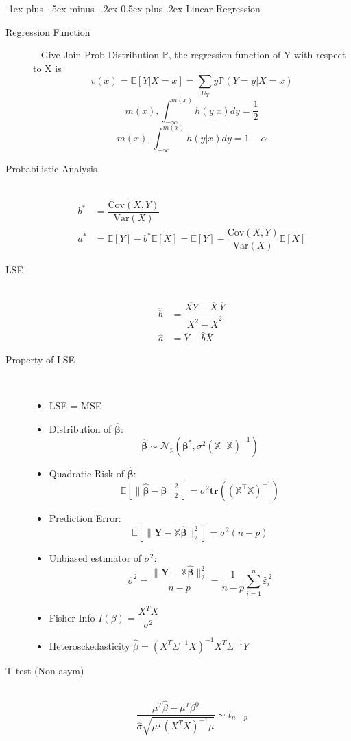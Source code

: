 \documentclass[a4paper, 10pt,landscape]{article}
\makeatletter
\newcommand{\var}{\textrm{Var}}
\newcommand{\cov}{\textrm{Cov}}
\renewcommand{\section}{\@startsection{section}{1}{0mm}%
                                {-1ex plus -.5ex minus -.2ex}%
                                {0.5ex plus .2ex}%
                                {\normalfont\large\bfseries}}
\makeatother
\begin{document}
\begin{multicols*}{4}
\section{Linear Regression}
	\begin{description}
		\item[Regression Function]~
			Give Join Prob Distribution $\mathbb{P}$, the regression function of Y with respect to X is 
			$$v(x) = \mathbb{E}[Y|X=x]=\sum_{\Omega_{Y}}y \mathbb{P}(Y=y|X=x)$$
			$$m(x), \int_{-\infty}^{m(x)}h(y|x)dy=\frac{1}{2}$$
			$$m(x), \int_{-\infty}^{m(x)}h(y|x)dy=1-\alpha$$
		\item[Probabilistic Analysis]~
			\begin{align*}
				b^* & = \dfrac{\cov\left(X,Y\right)}{\var\left(X\right)}\\
				a^* & = \mathbb{E}[Y]-b^*\mathbb{E}[X]=\mathbb{E}[Y]-\dfrac{\cov\left(X,Y\right)}{\var\left(X\right)}\mathbb{E}[X]
			\end{align*}
		\item[LSE]~
				\begin{align*}
					\hat{b} & = \dfrac{\overline{XY}-\overline{X}\,\overline{Y}}{\overline{X^2}-\overline{X}^2}\\
					\hat{a} & = \overline{Y}-\hat{b}\overline{X}
				\end{align*}
		\item[Property of LSE]~
			\begin{itemize}
				\item LSE = MSE
				\item Distribution of $\widehat{\boldsymbol{\beta}}$:
				$$\widehat{\boldsymbol{\beta}}\sim\mathcal{N}_p\left(\boldsymbol{\beta}^*,\sigma^2\left(\mathbb{X}^\intercal\mathbb{X}\right)^{-1}\right)$$
				\item Quadratic Risk of $\widehat{\boldsymbol{\beta}}$:
				$$\mathbb{E}\left[\lVert\widehat{\boldsymbol{\beta}}-\boldsymbol{\beta}\rVert_2^2\right]=\sigma^2\textbf{tr}\left(\left(\mathbb{X}^\intercal\mathbb{X}\right)^{-1}\right)$$
				\item Prediction Error:
				$$\mathbb{E}\left[\lVert\mathbf{Y}-\mathbb{X}\widehat{\boldsymbol{\beta}}\rVert_2^2\right]=\sigma^2\left(n-p\right)$$
				\item Unbiased estimator of $\sigma^2$:
				$$\widehat{\sigma}^2=\dfrac{\lVert\mathbf{Y}-\mathbb{X}\widehat{\boldsymbol{\beta}}\rVert_2^2}{n-p}=\dfrac{1}{n-p}\sum_{i=1}^{n}\widehat{\varepsilon}_i^{\,2}$$
				\item Fisher Info $I(\beta) = \dfrac{X^T X}{\sigma^2}$
				\item Heterosckedasticity $\widehat{\beta} = (X^T \Sigma^{-1}X)^{-1}X^T\Sigma^{-1}Y$
			\end{itemize}
		\item[T test (Non-asym)]~
			$$\dfrac{\mu^T \widehat{\beta} - \mu^T \beta^{0}}{\widehat{\sigma} \sqrt{\mu^T(X^T X)^{-1} \mu}} \sim t_{n-p}$$
	\end{description}


\end{multicols*}
\end{document}
